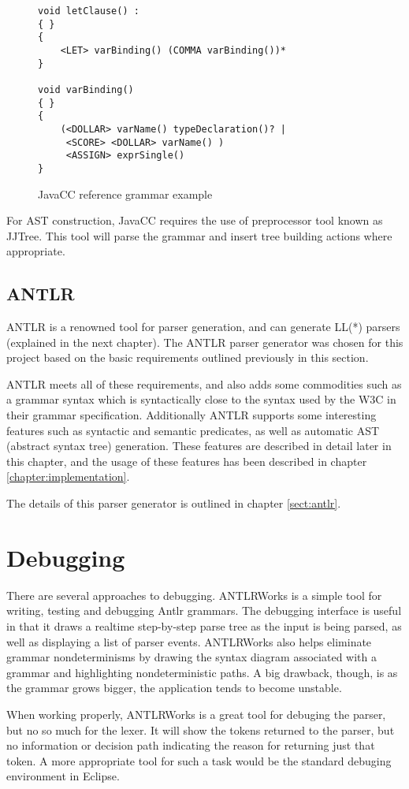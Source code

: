 \begin{figure}[h!]
\begin{Verbatim}
void letClause() :
{ }
{
    <LET> varBinding() (COMMA varBinding())*
} 

void varBinding()
{ }
{
    (<DOLLAR> varName() typeDeclaration()? | 
     <SCORE> <DOLLAR> varName() )
     <ASSIGN> exprSingle()
}
\end{Verbatim}
\caption{ JavaCC reference grammar example }
\label{code:parsers:javacc}
\end{figure}

For AST construction, JavaCC requires the use of preprocessor tool known as  
JJTree. This tool will parse the grammar and insert tree building actions where
appropriate. 

\subsection{ANTLR}
ANTLR is a renowned tool for parser generation, and can generate LL(*) parsers
(explained in the next chapter). The ANTLR parser generator was chosen for this
project based on the basic requirements outlined previously in this section.  

ANTLR meets all of these requirements, and also adds some commodities such as a
grammar syntax which is syntactically close to the syntax used by the W3C in
their grammar specification\cite{w3c01}. Additionally ANTLR supports some
interesting features such as syntactic and semantic predicates, as well as
automatic AST (abstract syntax tree) generation. These features are described in
detail later in this chapter, and the usage of these features has been described
in chapter \ref{chapter:implementation}.

The details of this parser generator is outlined in chapter \ref{sect:antlr}.

\section{Debugging}
\label{sect:method:debugging}
There are several approaches to debugging. ANTLRWorks \cite{antlrwrks00} is a
simple tool for writing, testing and debugging Antlr grammars. The debugging
interface is useful in that it draws a realtime step-by-step parse tree as the
input is being parsed, as well as displaying a list of parser events.
ANTLRWorks also helps eliminate grammar nondeterminisms by drawing the syntax
diagram associated with a grammar and highlighting nondeterministic paths. A
big drawback, though, is as the grammar grows bigger, the application tends to
become unstable.    

When working properly, ANTLRWorks is a great tool for debuging the parser, but
no so much for the lexer. It will show the tokens returned to the parser, but
no information or decision path indicating the reason for returning just that
token. A more appropriate tool for such a task would be the standard debuging
environment in Eclipse\cite{eclipse}.
